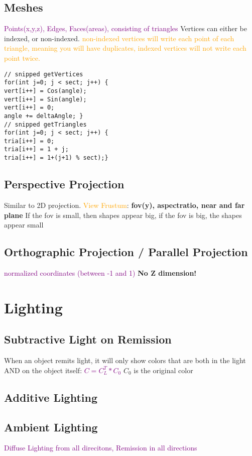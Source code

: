 \documentclass[main.tex,fontsize=12pt,paper=a4,paper=landscape,DIV=calc,]{scrartcl}
\begin{document}
\begin{multicols*}{4}
\subsection{Meshes}
\textcolor{purple}{Points(x,y,z), Edges, Faces(areas), consisting of triangles}
Vertices can either be indexed, or non-indexed.\newline
\textcolor{orange}{non-indexed vertices will write each point of each triangle, meaning you will have duplicates, indexed vertices will not write each point twice.}\newline
\begin{lstlisting}
// snipped getVertices
for(int j=0; j < sect; j++) {
vert[i++] = Cos(angle);
vert[i++] = Sin(angle);
vert[i++] = 0;
angle += deltaAngle; }
// snipped getTriangles
for(int j=0; j < sect; j++) {
tria[i++] = 0;
tria[i++] = 1 + j;
tria[i++] = 1+(j+1) % sect);}
\end{lstlisting}

\subsection{Perspective Projection}
Similar to 2D projection. \newline
\textcolor{orange}{View Frustum}: \newline
\textbf{fov(y), aspectratio, near and far plane}\newline
\textcolor{OliveGreen}{If the fov is small, then shapes appear big, if the fov is big, the shapes appear small}

\subsection{Orthographic Projection / Parallel Projection}
\textcolor{purple}{normalized coordinates (between -1 and 1)}\newline
\textbf{No Z dimension!}

\section{Lighting}
\subsection{Subtractive Light on Remission}
When an object remits light, it will only show colors that are both in the light AND on the object itself:\newline
\textcolor{purple}{\(C = C_L^T * C_0\)}\newline
\(C_0\) is the original color

\subsection{Additive Lighting}

\subsection{Ambient Lighting}
\textcolor{purple}{Diffuse Lighting from all direcitons, Remission in all directions}

\end{multicols*}
\end{document}
